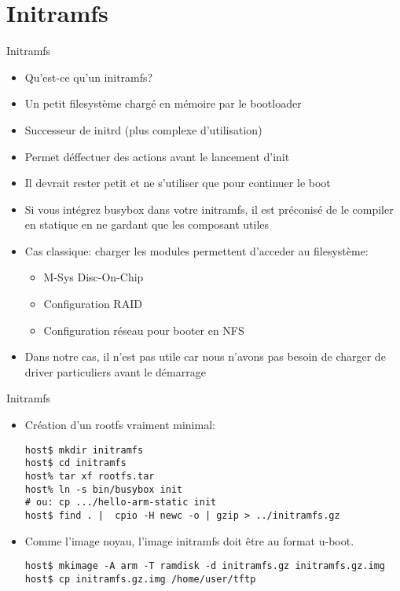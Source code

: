 \section{Initramfs}

\begin{frame}[fragile=singleslide]{Initramfs}
  \begin{itemize}
  \item Qu'est-ce qu'un initramfs?
  \item Un petit filesystème chargé en mémoire par le bootloader
  \item Successeur de initrd (plus complexe d'utilisation)
  \item Permet déffectuer des actions avant le lancement d'init
  \item Il devrait rester petit et ne s'utiliser que pour continuer le
    boot
  \item  Si  vous  intégrez  busybox  dans  votre  initramfs,  il  est
    préconisé  de  le compiler  en  statique  en  ne gardant  que  les
    composant utiles
  \item  Cas classique:  charger les  modules permettent  d'acceder au
    filesystème:
    \begin{itemize}
    \item M-Sys Disc-On-Chip
    \item Configuration RAID
    \item Configuration réseau pour booter en NFS
    \end{itemize}
  \item Dans notre cas, il n'est pas utile car nous n'avons pas besoin
    de charger de driver particuliers avant le démarrage
  \end{itemize}
\end{frame}

\begin{frame}[fragile=singleslide]{Initramfs}
  \begin{itemize}
  \item Création d'un rootfs vraiment minimal:
    \begin{lstlisting}
host$ mkdir initramfs
host$ cd initramfs
host% tar xf rootfs.tar
host% ln -s bin/busybox init
# ou: cp .../hello-arm-static init
host$ find . |  cpio -H newc -o | gzip > ../initramfs.gz
    \end{lstlisting}
  \item Comme l'image noyau, l'image initramfs doit être au format u-boot.
    \begin{lstlisting}
host$ mkimage -A arm -T ramdisk -d initramfs.gz initramfs.gz.img
host$ cp initramfs.gz.img /home/user/tftp
    \end{lstlisting}
  \end{itemize}
\end{frame}

